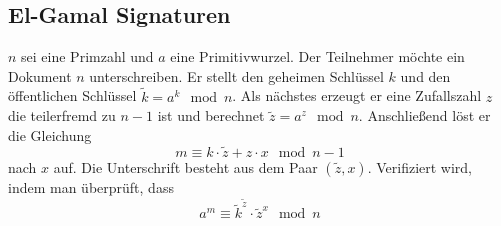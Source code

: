 \documentclass[a4paper, 12pt]{article}
\theoremstyle{plain}
\theoremstyle{definition}
\theoremstyle{lemma}
\theoremstyle{remark}
\theoremstyle{corollary}
\theoremstyle{example}
\begin{document}
	\subsection{El-Gamal Signaturen}
	$n$ sei eine Primzahl und $a$ eine Primitivwurzel. Der Teilnehmer möchte ein Dokument $n$ unterschreiben. Er stellt den geheimen Schlüssel $k$ und den öffentlichen Schlüssel $\tilde{k} = a^k \mod n$. Als nächstes erzeugt er eine Zufallszahl $z$ die teilerfremd zu $n-1$ ist und berechnet $\tilde{z} = a^z \mod n$. Anschließend löst er die Gleichung \[m \equiv k \cdot \tilde{z} + z \cdot x \mod n-1\] nach $x$ auf. Die Unterschrift besteht aus dem Paar $(\tilde{z},x)$. Verifiziert wird, indem man überprüft, dass \[a^m \equiv \tilde{k}^{\tilde{z}}\cdot \tilde{z}^x \mod n\]
\end{document}
